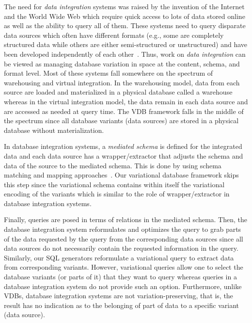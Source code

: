 The need for \emph{data integration} systems was raised by the invention of the Internet and 
the World Wide Web which require quick access to lots of data stored online as well
as the ability to query all of them. These systems need to query disparate data sources
which often have different formats (e.g., some are completely structured data while others are 
either semi-structured or unstructured) and have been developed independently of each 
other~\cite{dataIntegBook}.
%
Thus, work on \emph{data integration} can be viewed as managing database variation in
space at the content, schema, and format level.
%
Most of these systems fall somewhere on the spectrum of warehousing and 
virtual integration. In the warehousing model, data from each source are loaded
and materialized in a physical database called a warehouse whereas
in the virtual integration model, the data remain in each data source and are 
accessed as needed at query time. The VDB framework falls in the middle of 
the spectrum since all database variants (data sources) are stored in a physical database 
without materialization. 

In database integration systems, a \emph{mediated schema} is defined for the integrated data and each 
data source has a wrapper/extractor that adjusts the schema and data of the
source to the mediated schema. This is done by using schema matching and 
mapping approaches~\cite{Rahm01Survey,Doan05, schMapBook}. 
Our variational database framework skips this
step since the variational schema contains within itself the variational encoding
of the variants which is similar to the role of  wrapper/extractor in database integration
systems. 

Finally, queries are posed in terms of relations in the mediated schema. Then, the
database integration system reformulates and optimizes the query to grab parts
of the data requested by the query from 
the corresponding data sources since all data sources do not necessarily contain 
the requested information in the query. Similarly, our SQL generators reformulate a 
variational query to extract data from corresponding variants. However, variational 
queries allow one to select the database variants (or parts of it) that they want to query
whereas queries in a database integration system do not provide such an option. 
Furthermore, unlike VDBs, database integration systems are not variation-preserving, that is, the 
result has no indication as to the belonging of part of data to a specific variant (data source).



